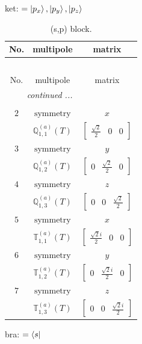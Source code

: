 \documentclass[fleqn,8pt,landscape]{jsarticle}
\begin{document}
\noindent
ket: $=\ket{p_{x}}, \ket{p_{y}}, \ket{p_{z}}$
\renewcommand{\arraystretch}{1.6}
\begin{longtable}{ccc}
\caption{(s,p) block.}
 \\
 \hline \hline
No. & multipole & matrix \\ \hline \endfirsthead

\multicolumn{2}{l}{\tablename\ \thetable{}} \\
 \hline \hline
No. & multipole & matrix \\ \hline \endhead

 \hline \hline
\multicolumn{2}{r}{\footnotesize\it continued ...} \\ \endfoot

 \hline \hline
\multicolumn{2}{r}{} \\ \endlastfoot

$ 2 $ & $ \text{symmetry} $ & $ x $ \\
$  $ & $ \mathbb{Q}_{1,1}^{(a)}(T) $ & $ \begin{bmatrix} \frac{\sqrt{2}}{2} & 0 & 0 \end{bmatrix} $ \\ \hline
$ 3 $ & $ \text{symmetry} $ & $ y $ \\
$  $ & $ \mathbb{Q}_{1,2}^{(a)}(T) $ & $ \begin{bmatrix} 0 & \frac{\sqrt{2}}{2} & 0 \end{bmatrix} $ \\ \hline
$ 4 $ & $ \text{symmetry} $ & $ z $ \\
$  $ & $ \mathbb{Q}_{1,3}^{(a)}(T) $ & $ \begin{bmatrix} 0 & 0 & \frac{\sqrt{2}}{2} \end{bmatrix} $ \\ \hline
$ 5 $ & $ \text{symmetry} $ & $ x $ \\
$  $ & $ \mathbb{T}_{1,1}^{(a)}(T) $ & $ \begin{bmatrix} \frac{\sqrt{2} i}{2} & 0 & 0 \end{bmatrix} $ \\ \hline
$ 6 $ & $ \text{symmetry} $ & $ y $ \\
$  $ & $ \mathbb{T}_{1,2}^{(a)}(T) $ & $ \begin{bmatrix} 0 & \frac{\sqrt{2} i}{2} & 0 \end{bmatrix} $ \\ \hline
$ 7 $ & $ \text{symmetry} $ & $ z $ \\
$  $ & $ \mathbb{T}_{1,3}^{(a)}(T) $ & $ \begin{bmatrix} 0 & 0 & \frac{\sqrt{2} i}{2} \end{bmatrix} $ \\ \hline
\end{longtable}
bra: $=\bra{s}$
\end{document}
